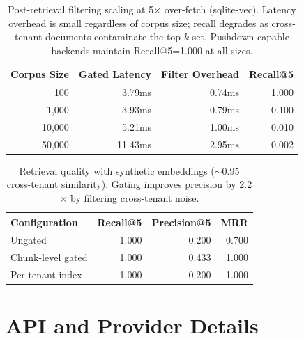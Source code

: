 \documentclass[sigconf]{acmart}
\begin{document}
\begin{table}[h]
  \centering
  \small
  \begin{tabular}{r|rrr}
  \toprule
  Corpus Size & Gated Latency & Filter Overhead & Recall@5 \\
  \midrule
  100 & 3.79ms & 0.74ms & 1.000 \\
  1,000 & 3.93ms & 0.79ms & 0.100 \\
  10,000 & 5.21ms & 1.00ms & 0.010 \\
  50,000 & 11.43ms & 2.95ms & 0.002 \\
  \bottomrule
  \end{tabular}
  \caption{Post-retrieval filtering scaling at 5$\times$ over-fetch (sqlite-vec). Latency overhead is small regardless of corpus size; recall degrades as cross-tenant documents contaminate the top-$k$ set. Pushdown-capable backends maintain Recall@5=1.000 at all sizes.}
  \label{tab:pushdown}
\end{table}

\begin{table}[h]
  \centering
  \small
  \begin{tabular}{l|rrr}
  \toprule
  Configuration & Recall@5 & Precision@5 & MRR \\
  \midrule
  Ungated & 1.000 & 0.200 & 0.700 \\
  Chunk-level gated & 1.000 & 0.433 & 1.000 \\
  Per-tenant index & 1.000 & 0.200 & 1.000 \\
  \bottomrule
  \end{tabular}
  \caption{Retrieval quality with synthetic embeddings (${\sim}$0.95 cross-tenant similarity). Gating improves precision by 2.2$\times$ by filtering cross-tenant noise.}
  \label{tab:retrieval-quality}
\end{table}


\onecolumn
\section{API and Provider Details}
\label{sec:api-details}
\end{document}
